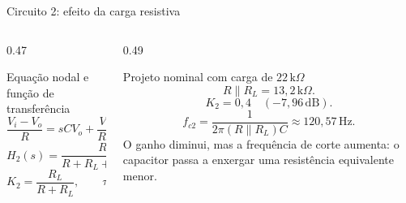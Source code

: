 \begin{frame}{Circuito 2: efeito da carga resistiva}
  \small
  \begin{columns}[T,onlytextwidth]
    \begin{column}{0.47\textwidth}
      \begin{block}{Equação nodal e função de transferência}
        \[
          \frac{V_i-V_o}{R}=sCV_o+\frac{V_o}{R_L}.
        \]
        \[
          H_2(s)=\frac{R_L}{R+R_L+sCRR_L}
          =\frac{K_2}{1+s\tau_2}.
        \]
        \[
          K_2=\frac{R_L}{R+R_L},\qquad
          \tau_2=(R\parallel R_L)C.
        \]
      \end{block}
    \end{column}
    \begin{column}{0.49\textwidth}
      \begin{alertblock}{Projeto nominal com carga de $22\,\mathrm{k}\Omega$}
        \[
          R\parallel R_L=13{,}2\,\mathrm{k}\Omega.
        \]
        \[
          K_2=0{,}4\quad(-7{,}96\,\mathrm{dB}).
        \]
        \[
          f_{c2}=\frac{1}{2\pi(R\parallel R_L)C}
          \approx120{,}57\,\mathrm{Hz}.
        \]
        O ganho diminui, mas a frequência de corte aumenta:
        o capacitor passa a enxergar uma resistência equivalente menor.
      \end{alertblock}
    \end{column}
  \end{columns}
\end{frame}
